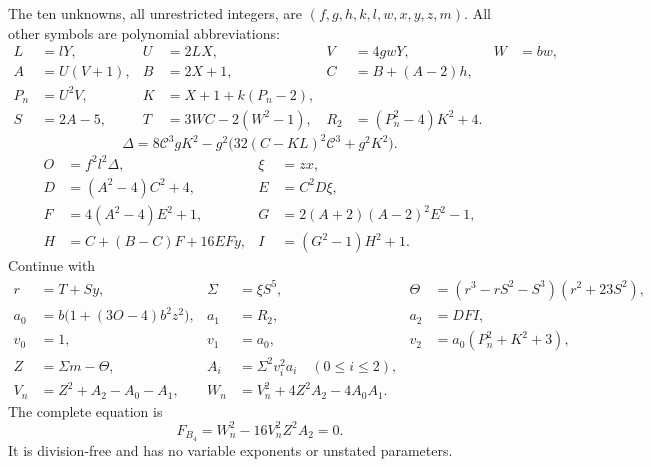 \documentclass[11pt]{article}
\begin{document}
The ten unknowns, all unrestricted integers, are
$(f,g,h,k,l,w,x,y,z,m)$. All other symbols are polynomial abbreviations:
\begin{align*}
 L&=lY,&U&=2LX,&V&=4gwY,&W&=bw,\\
 A&=U(V+1),&B&=2X+1,&C&=B+(A-2)h,\\
 P_n&=U^2V,&K&=X+1+k(P_n-2),\\
 S&=2A-5,&T&=3WC-2(W^2-1),&R_2&=(P_n^2-4)K^2+4.
\end{align*}
\[
 \Delta=8\mathscr C^3gK^2-g^2\bigl(32(C-KL)^2\mathscr C^3+g^2K^2\bigr).
\]
\begin{align*}
 O&=f^2l^2\Delta,&\xi&=zx,\\
 D&=(A^2-4)C^2+4,&E&=C^2D\xi,\\
 F&=4(A^2-4)E^2+1,&G&=2(A+2)(A-2)^2E^2-1,\\
 H&=C+(B-C)F+16EFy,&I&=(G^2-1)H^2+1.
\end{align*}
Continue with
\begin{align*}
 r&=T+Sy,&\Sigma&=\xi S^5,&
 \Theta&=(r^3-rS^2-S^3)(r^2+23S^2),\\
 a_0&=b\bigl(1+(3O-4)b^2z^2\bigr),&
 a_1&=R_2,&a_2&=DFI,\\
 v_0&=1,&v_1&=a_0,&v_2&=a_0(P_n^2+K^2+3),\\
 Z&=\Sigma m-\Theta,&A_i&=\Sigma^2v_i^2a_i\quad(0\le i\le2),\\
 V_n&=Z^2+A_2-A_0-A_1,&
 W_n&=V_n^2+4Z^2A_2-4A_0A_1.
\end{align*}
The complete equation is
\begin{equation}\boxed{F_{B_4}=W_n^2-16V_n^2Z^2A_2=0.}\label{eq:final}
\end{equation}
It is division-free and has no variable exponents or unstated parameters.
\end{document}
